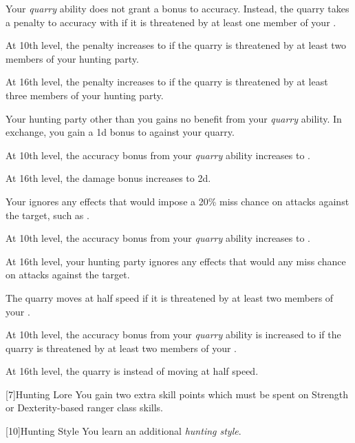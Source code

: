 {            
            Your \textit{quarry} ability does not grant a bonus to accuracy.
            Instead, the quarry takes a  penalty to accuracy with  if it is threatened by at least one member of your .
            \par At 10th level, the penalty increases to  if the quarry is threatened by at least two members of your hunting party.
            \par At 16th level, the penalty increases to  if the quarry is threatened by at least three members of your hunting party.

            Your hunting party other than you gains no benefit from your \textit{quarry} ability.
            In exchange, you gain a \plus1d bonus to  against your quarry.
            \par At 10th level, the accuracy bonus from your \textit{quarry} ability increases to .
            \par At 16th level, the damage bonus increases to \plus2d.

            Your  ignores any effects that would impose a 20\% miss chance on attacks against the target, such as .
            \par At 10th level, the accuracy bonus from your \textit{quarry} ability increases to .
            \par At 16th level, your hunting party ignores any effects that would any miss chance on attacks against the target.

            The quarry moves at half speed if it is threatened by at least two members of your .
            \par At 10th level, the accuracy bonus from your \textit{quarry} ability is increased to  if the quarry is threatened by at least two members of your .
            \par At 16th level, the quarry is \immobilized instead of moving at half speed.
        }

        [7]{Hunting Lore} You gain two extra skill points which must be spent on Strength or Dexterity-based ranger class skills.

        [10]{Hunting Style}
        You learn an additional \textit{hunting style}.

